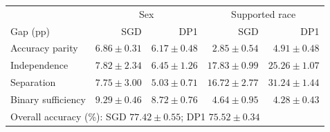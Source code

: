 \begin{tabular*}{\linewidth}{@{\extracolsep{\fill}}lrrrr@{}}
\toprule
 & \multicolumn{2}{c}{Sex} & \multicolumn{2}{c}{Supported race} \\
Gap (pp) & SGD & DP1 & SGD & DP1 \\
\midrule
Accuracy parity & $6.86\!\pm\!0.31$ & $6.17\!\pm\!0.48$ & $2.85\!\pm\!0.54$ & $4.91\!\pm\!0.48$ \\
Independence & $7.82\!\pm\!2.34$ & $6.45\!\pm\!1.26$ & $17.83\!\pm\!0.99$ & $25.26\!\pm\!1.07$ \\
Separation & $7.75\!\pm\!3.00$ & $5.03\!\pm\!0.71$ & $16.72\!\pm\!2.77$ & $31.24\!\pm\!1.44$ \\
Binary sufficiency & $9.29\!\pm\!0.46$ & $8.72\!\pm\!0.76$ & $4.64\!\pm\!0.95$ & $4.28\!\pm\!0.43$ \\
\midrule
\multicolumn{5}{l}{Overall accuracy (\%): SGD $77.42\pm0.55$; DP1 $75.52\pm0.34$} \\
\bottomrule
\end{tabular*}

